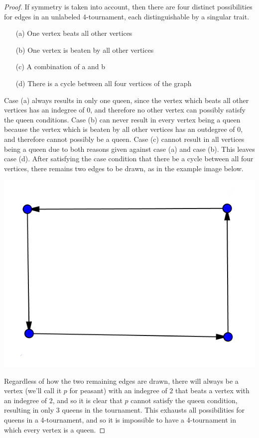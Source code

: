 \documentclass[12pt]{article}
\begin{document}
\begin{proof}
If symmetry is taken into account, then there are four distinct possibilities for edges in an unlabeled 4-tournament, each distinguishable by a singular trait.
\begin{enumerate}
\item[(a)] One vertex beats all other vertices
\item[(b)] One vertex is beaten by all other vertices
\item[(c)] A combination of a and b
\item[(d)] There is a cycle between all four vertices of the graph
\end{enumerate}
Case (a) always results in only one queen, since the vertex which beats all other vertices has an indegree of 0, and therefore no other vertex can possibly satisfy the queen conditions. Case (b) can never result in every vertex being a queen because the vertex which is beaten by all other vertices has an outdegree of $0$, and therefore cannot possibly be a queen. Case (c) cannot result in all vertices being a queen due to both reasons given against case (a) and case (b). This leaves case (d). After satisfying the case condition that there be a cycle between all four vertices, there remains two edges to be drawn, as in the example image below.
\begin{center}
\includegraphics[scale=0.8]{Prob_3_1.png}
\end{center}
Regardless of how the two remaining edges are drawn, there will always be a vertex (we'll call it $p$ for peasant) with an indegree of $2$ that beats a vertex with an indegree of $2$, and so it is clear that $p$ cannot satisfy the queen condition, resulting in only $3$ queens in the tournament. This exhausts all possibilities for queens in a 4-tournament, and so it is impossible to have a 4-tournament in which every vertex is a queen.
\end{proof}
\end{document}
